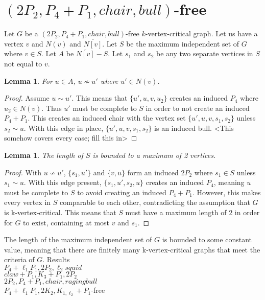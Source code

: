 \documentclass[11pt]{article}
\newtheorem{lemma}[theorem]{Lemma}
\theoremstyle{definition}
\newcommand{\noneighbs}{\overline{N[v]}}
\begin{document}
\section{$(2P_2, P_4 + P_1, chair, bull)$-free}
Let $G$ be a $(2P_2, P_4 + P_1, chair, bull)$-free $k$-vertex-critical graph. Let us have a vertex $v$ and $N(v)$ and $\noneighbs$. Let $S$ be the maximum independent set of $G$ where $v \in S$. Let $A$ be $\noneighbs - S$. Let $s_1$ and $s_2$ be any two separate vertices in $S$ not equal to $v$.
\begin{lemma}\label{lem:chairBullOne}
For $u \in A$, $u \not \sim u'$ where $u' \in N(v)$.
\end{lemma}
\begin{proof}
Assume $u \sim u'$. This means that $\{u', u, v, u_2\}$ creates an induced $P_4$ where $u_2 \in N(v)$. Thus $u'$ must be complete to $S$ in order to not create an induced $P_4 + P_1$. This creates an induced chair with the vertex set $\{u', u, v, s_1, s_2\}$ unless $s_2 \sim u$. With this edge in place, $\{u', u, v, s_1, s_2\}$ is an induced bull. <This somehow covers every case; fill this in>
\end{proof}
\begin{lemma}\label{lem:chairBullTwo}
The length of $S$ is bounded to a maximum of 2 vertices.
\end{lemma}
\begin{proof}
With $u \not \sim u'$, $\{s_1, u'\}$ and $\{v, u\}$ form an induced $2P_2$ where $s_1 \in S$ unless $s_1 \sim u$. With this edge present, $\{s_1, u', s_2, u\}$ creates an induced $P_4$, meaning $u$ must be complete to $S$ to avoid creating an induced $P_4 + P_1$. However, this makes every vertex in $S$ comparable to each other, contradicting the assumption that $G$ is k-vertex-critical. This means that $S$ must have a maximum length of 2 in order for $G$ to exist, containing at most $v$ and $s_1$.
\end{proof}
The length of the maximum independent set of $G$ is bounded to some constant value, meaning that there are finitely many k-vertex-critical graphs that meet the criteria of $G$.
Results\\
$P_4 + \ell_1 P_1, 2P_2, \ell_2 squid$\\
$claw + P_1, K_3 + P_1, 2P_2$\\
$2P_2, P_4 + P_1, chair, raging bull$\\
$P_4+ \ell_1 P_1, 2K_2, K_{1,\ell_2} + P_1$-free
\end{document}
